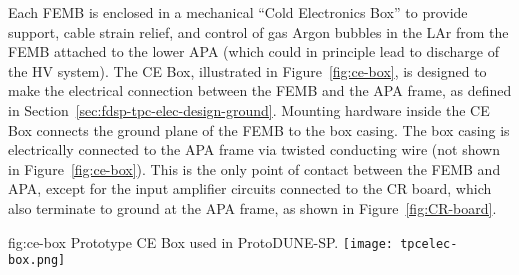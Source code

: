 Each FEMB is enclosed in a mechanical ``Cold Electronics Box'' to provide support, cable strain
relief, and control of gas Argon bubbles in the LAr from the FEMB attached to the lower APA
(which could in principle lead to discharge of the HV system).
The CE Box, illustrated in Figure~\ref{fig:ce-box}, is designed to make the electrical connection 
between the FEMB and the APA frame, as defined in Section~\ref{sec:fdsp-tpc-elec-design-ground}.
Mounting hardware inside the CE Box connects the ground plane of the FEMB to the box casing. The
box casing is electrically connected to the APA frame via twisted conducting wire (not 
shown in Figure~\ref{fig:ce-box}). This is the only point of contact between the FEMB and
APA, except for the input amplifier circuits connected to the CR board, which also terminate to
ground at the APA frame, as shown in Figure~\ref{fig:CR-board}.

\begin{dunefigure}
{fig:ce-box}
{Prototype CE Box used in ProtoDUNE-SP.}
\texttt{[image: tpcelec-box.png]}
\end{dunefigure}
